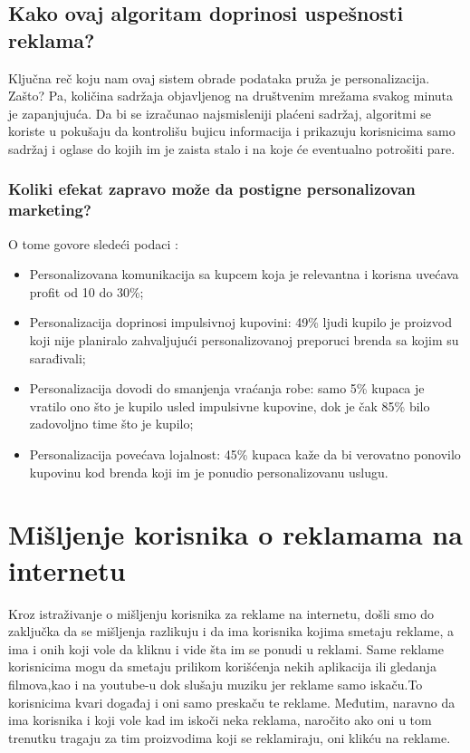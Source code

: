 \documentclass[a4paper]{article}
\begin{document}
{{			\subsection{Kako ovaj algoritam doprinosi uspešnosti reklama?}
			\label{subsec:uspesnostreklama}
			Ključna reč koju nam ovaj sistem obrade podataka pruža je personalizacija. Zašto? Pa, količina sadržaja objavljenog na društvenim mrežama svakog minuta je zapanjujuća. Da bi se izračunao najsmisleniji plaćeni sadržaj, algoritmi se koriste u pokušaju da kontrolišu bujicu 		informacija i prikazuju korisnicima samo sadržaj i oglase do kojih im je zaista stalo i na koje će eventualno potrošiti pare.
			\subsubsection{Koliki efekat zapravo može da postigne personalizovan marketing?}
			O tome govore sledeći podaci \cite{statistikai}:
			\begin{itemize}
				\item Personalizovana komunikacija sa kupcem koja je relevantna i korisna uvećava profit od 10 do 30\%;
				\item Personalizacija doprinosi impulsivnoj kupovini: 49\% ljudi kupilo je proizvod koji nije planiralo zahvaljujući personalizovanoj preporuci brenda sa kojim su sarađivali;
				\item Personalizacija dovodi do smanjenja vraćanja robe: samo 5\% kupaca je vratilo ono što je kupilo usled impulsivne kupovine, dok je čak 85\% bilo zadovoljno time što je kupilo;
				\item Personalizacija povećava lojalnost: 45\% kupaca kaže da bi verovatno ponovilo kupovinu kod brenda koji im je ponudio personalizovanu uslugu.
			\end{itemize} 
			
			
			\section{Mišljenje korisnika o reklamama na internetu}
			\label{sec:misljenje}
			Kroz istraživanje o mišljenju korisnika za reklame na internetu, došli smo do zaključka da se mišljenja razlikuju i da ima korisnika kojima smetaju reklame, a ima i onih koji vole da kliknu i vide šta im se ponudi u reklami.
			Same reklame korisnicima mogu da smetaju prilikom korišćenja nekih aplikacija ili gledanja filmova,kao i na youtube-u dok slušaju muziku jer reklame samo iskaču.To korisnicima kvari događaj i oni samo preskaču te reklame.
			Međutim, naravno da ima korisnika i koji vole kad im iskoči neka reklama, naročito ako oni u tom trenutku tragaju za tim proizvodima koji se reklamiraju, oni klikću na reklame.
}}
\end{document}
